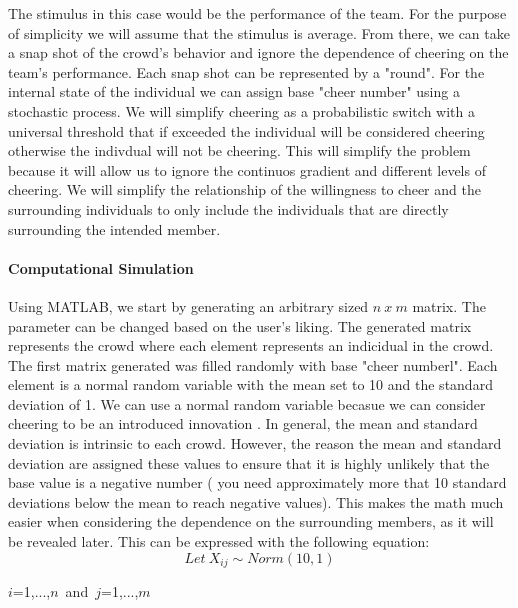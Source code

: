 \documentclass[oneside,12pt]{report}
\begin{document}
The stimulus in this case would be the performance of the team. For the purpose of simplicity we will assume that the stimulus is average. From there, we can take a snap shot of the crowd's behavior and ignore the dependence of cheering on the team's performance. Each snap shot can be represented by a "round".  
\newline
For the internal state of the individual we can assign base "cheer number" using a stochastic process. We will simplify cheering as a probabilistic switch with a universal threshold that if exceeded the individual will be considered cheering otherwise the indivdual will not be cheering. This will simplify the problem because it will allow us to ignore the continuos gradient and different levels of cheering. 
\newline
We will simplify the relationship of the willingness to cheer and the surrounding individuals to only include the individuals that are directly surrounding the intended member.

\paragraph {Computational Simulation}

Using MATLAB, we start by generating an arbitrary sized $n~x~m$ matrix. The parameter can be changed based on the user's liking. The generated matrix represents the crowd where each element represents an indicidual in the crowd. The first matrix generated was filled randomly with  base "cheer numberl". Each element is a normal random variable with the mean set to 10 and the standard deviation of 1. We can use a normal random variable becasue we can consider cheering to be an introduced innovation \cite{DI2003}.  In general, the mean and standard deviation is intrinsic to each crowd. However, the reason the mean and standard deviation are assigned these values to ensure that it is highly unlikely that the base value is a negative number ( you need approximately more that 10 standard deviations below the mean to reach negative values). This makes the math much easier when considering the dependence on the surrounding members, as it will be revealed later. This can be expressed with the following equation:
\[ Let~ X_{ij}\sim Norm(10,1)\]

$i$={1,...,$n$}~and~$j$={1,...,$m$}\newline
 
\end{document}
